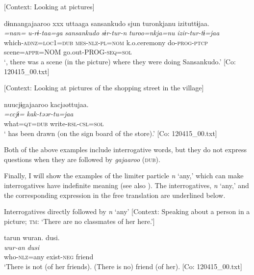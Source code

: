 \ea \label{ex:5:40}  \ea \label{ex:5:40a} [Context: Looking at pictures]

\glll  dɨnnangajaaroo  xxx  uttaaga  {\textbar}sansankudo{\textbar}   sjun  turonkjanu  izituttɨjaa.\footnotemark\\
\textit{=nan=}    \textit{u-rɨ-taa=ga}  \textit{sansankudo}   \textit{sɨr-tur-n}  \textit{turoo=nkja=nu}  \textit{izir-tur-tɨ=jaa}\\
which-\textsc{adnz}=\textsc{loc}1=\textsc{dub}    \textsc{mes}-\textsc{nlz}-\textsc{pl}=\textsc{nom}  k.o.ceremony   do-\textsc{prog}-\textsc{ptcp}  scene=\textsc{appr}=NOM  go.out-PROG-\textsc{seq}=\textsc{sol}      \\
\glt ‘, there was a scene (in the picture) where they were doing Sansankudo.’ [Co: 120415\_00.txt]

 \ex \label{ex:5:b} [Context: Looking at pictures of the shopping street in the village]

\glll  nuucjɨgajaaroo  kacjəəttujaa.\\
\textit{=ccjɨ=}  \textit{kak-təər-tu=jaa}\\
what=\textsc{qt}=\textsc{dub}  write-\textsc{rsl}-\textsc{csl}=\textsc{sol}\\
\glt ‘ has been drawn (on the sign board of the store).’ [Co: 120415\_00.txt]
\z
\z

Both of the above examples include interrogative words, but they do not express questions when they are followed by \textit{gajaaroo} (\textsc{dub}).

  Finally, I will show the examples of the limiter particle \textit{n} ‘any,’ which can make interrogatives have indefinite meaning (see also ). The interrogatives, \textit{n} ‘any,’ and the corresponding expression in the free translation are underlined below.

\ea \label{ex:5:41}   Interrogatives directly followed by \textit{n} ‘any’
 \ea \label{ex:5:41a} [Context: Speaking about a person in a picture; \textsc{tm}: ‘There are no classmates of her here.’]

\glll  tarun  wuran.  dusi.\\
\textit{}  \textit{wur-an}  \textit{dusi}\\
who-\textsc{nlz}=any  exist-\textsc{neg}  friend\\
\glt ‘There is not  (of her friends). (There is no) friend (of her). [Co: 120415\_00.txt]

